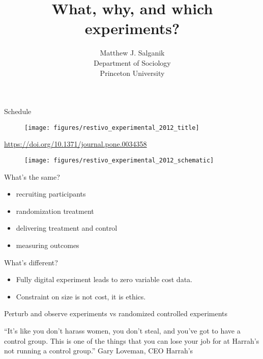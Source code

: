 \documentclass[aspectratio=169]{beamer}
\title[]{What, why, and which experiments?}
\author[]{Matthew J. Salganik\\Department of Sociology\\Princeton University}
\date[]{Summer Institutes in Computational Social Science\\June 22, 2019
\vfill
\begin{flushleft}
{\scriptsize
The Summer Institutes in Computational Social Science is supported by grants from the Russell Sage Foundation and the Alfred P. Sloan Foundation.}
\end{flushleft}
\begin{flushright}
\texttt{[image: figures/cc-by.png]}
\end{flushright}
}
\begin{document}
\frame{\titlepage}
\begin{frame}

Schedule

\end{frame}
\begin{frame}

\begin{figure}
  \centering
  \texttt{[image: figures/restivo\_experimental\_2012\_title]}
\end{figure}

\vfill
\url{ https://doi.org/10.1371/journal.pone.0034358}
\end{frame}
\begin{frame}

\begin{figure}
  \centering
  \texttt{[image: figures/restivo\_experimental\_2012\_schematic]}
\end{figure}

\end{frame}
\begin{frame}

What's the same?
\begin{itemize}
\item recruiting participants
\item randomization treatment
\item delivering treatment and control
\item measuring outcomes
\end{itemize}

\pause 
\vfill

What's different?
\begin{itemize}
\item Fully digital experiment leads to zero variable cost data.
\pause
\item Constraint on size is not cost, it is ethics.
\end{itemize}

\end{frame}
\begin{frame}

Perturb and observe experiments vs randomized controlled experiments

\end{frame}
\begin{frame}

``It's like you don't harass women, you don't steal, and you've got to have a control group. This is one of the things that you can lose your job for at Harrah's not running a control group.''
Gary Loveman, CEO Harrah's

\end{frame}
\end{document}

